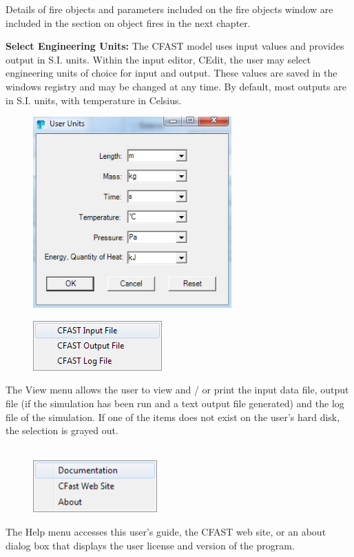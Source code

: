 Details of fire objects and parameters included on the fire objects window are included in the section on object fires in the next chapter.

\textbf{Select Engineering Units:} The CFAST model uses input values and provides output in S.I. units. Within the input editor, CEdit, the user may select engineering units of choice for input and output.  These values are saved in the windows registry and may be changed at any time. By default, most outputs are in S.I. units, with temperature in Celsius.

\begin{figure}
  \includegraphics[width=3in]{FIGURES/Running_CFAST/Select_Engineering_Units}
\end{figure}

\clearpage

\begin{figure}
  \includegraphics[width=1.95in]{FIGURES/Running_CFAST/View_Menu}
\end{figure}

The View menu allows the user to view and / or print the input data file, output file (if the simulation has been run and a text output file generated) and the log file of the simulation. If one of the items does not exist on the user's hard disk, the selection is grayed out. \\~ \\

\begin{figure}
  \includegraphics[width=1.88in]{FIGURES/Running_CFAST/Help_Menu}
\end{figure}
 The Help menu accesses this user's guide, the CFAST web site, or an about dialog box that displays the user license and version of the program. \\~ \\

